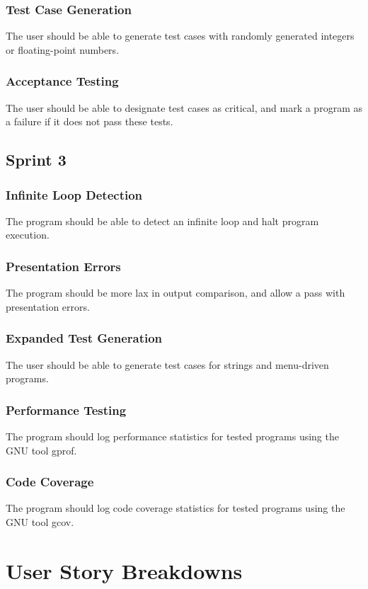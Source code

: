 \subsubsection{Test Case Generation}
The user should be able to generate test cases with randomly generated integers or floating-point numbers.

\subsubsection {Acceptance Testing}
The user should be able to designate test cases as critical, and mark a program as a failure if it does not pass these tests.

\subsection{Sprint 3}

\subsubsection{Infinite Loop Detection}
The program should be able to detect an infinite loop and halt program execution.

\subsubsection{Presentation Errors}
The program should be more lax in output comparison, and allow a pass with presentation errors.

\subsubsection{Expanded Test Generation}
The user should be able to generate test cases for strings and menu-driven programs.

\subsubsection{Performance Testing}
The program should log performance statistics for tested programs using the GNU tool gprof.

\subsubsection{Code Coverage}
The program should log code coverage statistics for tested programs using the GNU tool gcov.

\section{User Story Breakdowns}
